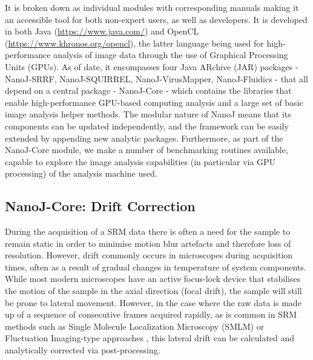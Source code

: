  It is broken down as individual modules with corresponding manuals making it an accessible tool for both non-expert users, as well as developers. It is developed in both Java (\href{https://www.java.com/}{https://www.java.com/}) and OpenCL (\href{https://www.khronos.org/opencl}{https://www.khronos.org/opencl}), the latter language being used for high-performance analysis of image data through the use of Graphical Processing Units (GPUs). As of date, it encompasses four Java ARchive (JAR) packages - NanoJ-SRRF, NanoJ-SQUIRREL, NanoJ-VirusMapper, NanoJ-Fluidics - that all depend on a central package - NanoJ-Core - which contains the libraries that enable high-performance GPU-based computing analysis and a large set of basic image analysis helper methods. The modular nature of NanoJ means that its components can be updated independently, and the framework can be easily extended by appending new analytic packages. Furthermore, as part of the NanoJ-Core module, we make a number of benchmarking routines available, capable to explore the image analysis capabilities (in particular via GPU processing) of the analysis machine used.

\subsection*{NanoJ-Core: Drift Correction}
 During the acquisition of a SRM data there is often a need for the sample to remain static in order to minimise motion blur artefacts and therefore loss of resolution. However, drift commonly occurs in microscopes during acquisition times, often as a result of gradual changes in temperature of system components. While most modern microscopes have an active focus-lock device that stabilises the motion of the sample in the axial direction (focal drift), the sample will still be prone to lateral movement. However, in the case where the raw data is made up of a sequence of consecutive frames acquired rapidly, as is common in SRM methods such as Single Molecule Localization Microscopy (SMLM) \cite{betzig2006imaging,rust2006sub} or Fluctuation Imaging-type approaches \cite{gustafsson2016fast,dertinger2009fast,cox2012bayesian}, this lateral drift can be calculated and analytically corrected via post-processing.
 
